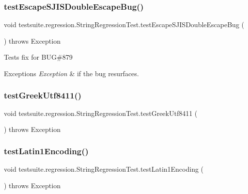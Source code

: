 \subsubsection{\texorpdfstring{test\+Escape\+S\+J\+I\+S\+Double\+Escape\+Bug()}{testEscapeSJISDoubleEscapeBug()}}
{\footnotesize\ttfamily void testsuite.\+regression.\+String\+Regression\+Test.\+test\+Escape\+S\+J\+I\+S\+Double\+Escape\+Bug (\begin{DoxyParamCaption}{ }\end{DoxyParamCaption}) throws Exception}

Tests fix for B\+UG\#879


\begin{DoxyExceptions}{Exceptions}
{\em Exception} & if the bug resurfaces. \\
\hline
\end{DoxyExceptions}
\mbox{\label{classtestsuite_1_1regression_1_1_string_regression_test_a8a0195ab620f64bccaf9f34841536e70}} 
\subsubsection{\texorpdfstring{test\+Greek\+Utf8411()}{testGreekUtf8411()}}
{\footnotesize\ttfamily void testsuite.\+regression.\+String\+Regression\+Test.\+test\+Greek\+Utf8411 (\begin{DoxyParamCaption}{ }\end{DoxyParamCaption}) throws Exception}

\mbox{\label{classtestsuite_1_1regression_1_1_string_regression_test_abcc37c5fb4c57b3f201afaadbc55ee13}} 
\subsubsection{\texorpdfstring{test\+Latin1\+Encoding()}{testLatin1Encoding()}}
{\footnotesize\ttfamily void testsuite.\+regression.\+String\+Regression\+Test.\+test\+Latin1\+Encoding (\begin{DoxyParamCaption}{ }\end{DoxyParamCaption}) throws Exception}

